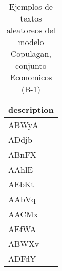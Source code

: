 \begin{table}[H]
\centering
\fontsize{8}{14}\selectfont
\caption{Ejemplos de textos aleatoreos del modelo Copulagan, conjunto Economicos (B-1)}
\label{table-sample10-economicos-b-1-copulagan-text}
\begin{tabular}{|m{50em}|}
\hline
\rowcolor[gray]{0.8}
description \\
\hline ABWyA \\
\hline ADdjb \\
\hline ABnFX \\
\hline AAhlE \\
\hline AEbKt \\
\hline AAbVq \\
\hline AACMx \\
\hline AEfWA \\
\hline ABWXv \\
\hline ADFdY \\
\hline
\end{tabular}
\end{table}
